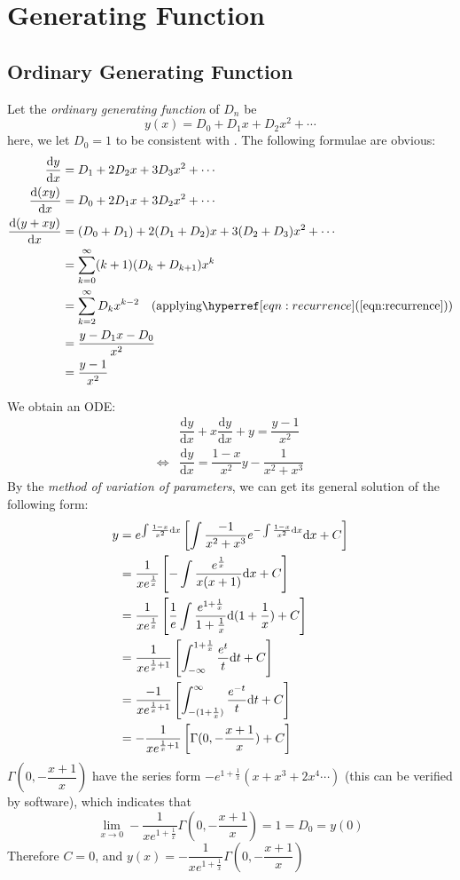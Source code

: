
\section{Generating Function}
\subsection{Ordinary Generating Function}
Let the \emph{ordinary generating function} of $ D_n$ be
\[ y(x) = D_0 + D_1x+D_2x^2+\cdots \]
here, we let $ D_0=1$ to be consistent with .
The following formulae are obvious:
\begin{align*}
 \dfrac{\mathrm{d}y}{\mathrm{d}x} &= D_1+2D_2x+3D_3x^2+\cdots  \\
 \dfrac{\mathrm{d}(xy)}{\mathrm{d}x} &=D_0+2D_1x+3D_2x^2+\cdots \\
 \dfrac{\mathrm{d}(y+xy)}{\mathrm{d}x} &= (D_0 +D_1) + 2(D_1+D_2)x+3(D_2+D_3)x^2+\cdots \\
 &=\sum_{k=0}^{\infty}(k+1)(D_{k}+D_{k+1})x^k \\
 &=\sum_{k=2}^{\infty}D_kx^{k-2} \quad (\text{applying} \eqnref{recurrence}) \\
 &=\dfrac{y-D_1x-D_0}{x^2}\\
 &=\dfrac{y-1}{x^2}
\end{align*}

We obtain an ODE:
 \begin{align*}
& \dfrac{\mathrm{d}y}{\mathrm{d}x}+x\dfrac{\mathrm{d}y}{\mathrm{d}x} +y=\dfrac{y-1}{x^2}\\
\Leftrightarrow &\dfrac{\mathrm{d}y}{\mathrm{d}x}=\dfrac{1-x}{x^2}y -\dfrac{1}{x^2+x^3}
 \end{align*}
By the \emph{method of variation of parameters},
we can get its general solution of the following form:
\begin{align*}
y&=e^{\Oldint\frac{1-x}{x^2}\mathrm{d}x}\left[\int\dfrac{-1}{x^2+x^3}e^{-\Oldint\frac{1-x}{x^2}\mathrm{d}x}\mathrm{d}x+C\right] \\
&=\dfrac{1}{xe^{\frac{1}{x}}}\left[-\int\dfrac{e^{\frac{1}{x}}}{x(x+1)}\mathrm{d}x+C\right] \\
& =\dfrac{1}{xe^{\frac{1}{x}}}\left[\dfrac{1}{e}\int\dfrac{e^{1+\frac{1}{x}}}{1+\frac{1}{x}}\mathrm{d}(1+\dfrac{1}{x})+C\right]\\
&=\dfrac{1}{xe^{\frac{1}{x}+1}}\left[\int_{-\infty}^{1+\frac{1}{x}}\dfrac{e^t}{t}\mathrm{d}t+C\right]\\
&=\dfrac{-1}{xe^{\frac{1}{x}+1}}\left[\int_{-(1+\frac{1}{x})}^{\infty}\dfrac{e^{-t}}{t}\mathrm{d}t+C\right]\\
&=-\dfrac{1}{xe^{\frac{1}{x}+1}}\left[\Gamma(0,-\dfrac{x+1}{x})+C\right]
\end{align*}
$\Gamma(0,-\dfrac{x+1}{x})$ have the series form $ -e^{1+\frac{1}{x}}(x+x^3+2 x^4\cdots )$
(this can be verified by software), which indicates that
\[ \lim\limits_{x\to0}-\dfrac{1}{xe^{1+\frac{1}{x}}}\Gamma(0, -\dfrac{x+1}{x}) = 1 = D_0=y(0)\]
Therefore $ C=0$, and $ y(x) = -\dfrac{1}{xe^{1+\frac{1}{x}}}\Gamma(0, -\dfrac{x+1}{x})$

